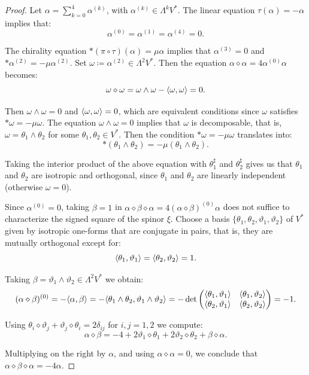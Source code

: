 \documentclass[10pt,reqno]{amsart}
\theoremstyle{definition}
\theoremstyle{remark}
\DeclarePairedDelimiter{\escal}{\langle}{\rangle}
\begin{document}
\begin{proof}
    Let $\alpha=\sum_{k=0}^4\alpha^{(k)}$, with $\alpha^{(k)}\in\Lambda^kV^*$. The linear equation $\tau(\alpha)=-\alpha$ implies that: $$\alpha^{(0)}=\alpha^{(1)}=\alpha^{(4)}=0.$$
    
    The chirality equation $*(\pi\circ\tau)(\alpha)=\mu\alpha$ implies that $\alpha^{(3)}=0$ and $*\alpha^{(2)}=-\mu\alpha^{(2)}$. Set $\omega\coloneqq\alpha^{(2)}\in\Lambda^2V^*$. Then the equation $\alpha\diamond\alpha=4\alpha^{(0)}\alpha$ becomes: $$\omega\diamond\omega=\omega\wedge\omega-\escal{\omega,\omega}=0.$$

    Then $\omega\wedge\omega=0$ and $\escal{\omega,\omega}=0$, which are equivalent conditions since $\omega$ satisfies $*\omega=-\mu\omega$. The equation $\omega\wedge\omega=0$ implies that $\omega$ is decomposable, that is, $\omega=\theta_1\wedge\theta_2$ for some $\theta_1,\theta_2\in V^*$. Then the condition $*\omega=-\mu\omega$ translates into: $$*(\theta_1\wedge\theta_2)=-\mu(\theta_1\wedge\theta_2).$$

    Taking the interior product of the above equation with $\theta_1^\sharp$ and $\theta_2^\sharp$ gives us that $\theta_1$ and $\theta_2$ are isotropic and orthogonal, since $\theta_1$ and $\theta_2$ are linearly independent (otherwise $\omega=0$).\medskip
    
    Since $\alpha^{(0)}=0$, taking $\beta=1$ in $\alpha\diamond\beta\diamond\alpha=4(\alpha\diamond\beta)^{(0)}\alpha$ does not suffice to characterize the signed square of the spinor $\xi$. Choose a basis $\{\theta_1,\theta_2,\vartheta_1,\vartheta_2\}$ of $V^*$ given by isotropic one-forms that are conjugate in pairs, that is, they are mutually orthogonal except for: $$\escal{\theta_1,\vartheta_1}=\escal{\theta_2,\vartheta_2}=1.$$

    Taking $\beta=\vartheta_1\wedge\vartheta_2\in\Lambda^2V^*$ we obtain: $$(\alpha\diamond\beta)^{(0)}=-\escal{\alpha,\beta}=-\escal{\theta_1\wedge\theta_2,\vartheta_1\wedge\vartheta_2}=-\det\begin{pmatrix}
        \escal{\theta_1,\vartheta_1}&\escal{\theta_1,\vartheta_2}\\
        \escal{\theta_2,\vartheta_1}&\escal{\theta_2,\vartheta_2}
    \end{pmatrix}=-1.$$

    Using $\theta_i\diamond\vartheta_j+\vartheta_j\diamond\theta_i=2\delta_{ij}$ for $i,j=1,2$ we compute: $$\alpha\diamond\beta=-4+2\vartheta_1\diamond\theta_1+2\vartheta_2\diamond\theta_2+\beta\diamond\alpha.$$
    
    Multiplying on the right by $\alpha$, and using $\alpha\diamond\alpha=0$, we conclude that $\alpha\diamond\beta\diamond\alpha=-4\alpha$.
\end{proof}
\end{document}
